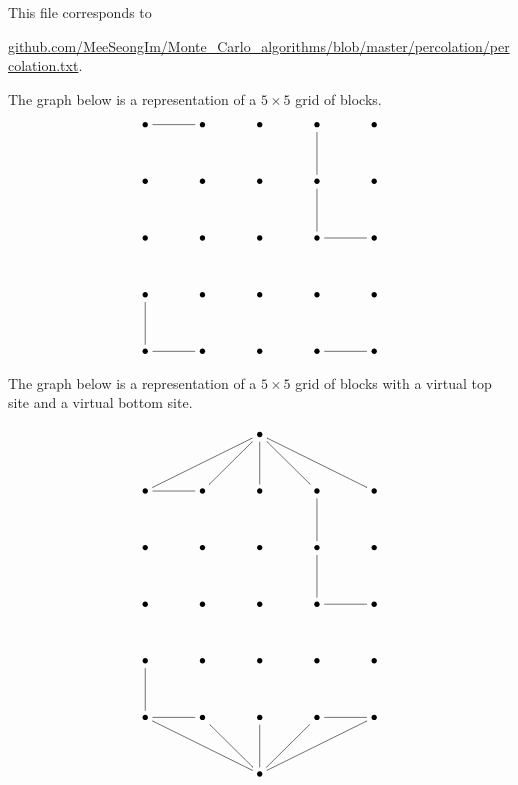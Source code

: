 \documentclass[reqno]{amsart}
\begin{document}
This file corresponds to

 \href{https://github.com/MeeSeongIm/Monte\_Carlo\_algorithms/blob/master/percolation/percolation.txt}{github.com/MeeSeongIm/Monte\_Carlo\_algorithms/blob/master/percolation/percolation.txt}.
 
\bigskip 
\bigskip 


  
The graph below is a representation of a $5\times 5$ grid of blocks. 
\[ 
\xymatrix@-1pc{
\bullet \ar@{-}[rr] & & \bullet & & \bullet & & \bullet \ar@{-}[dd]& & \bullet \\ 
 & &   & &   & &   & & \\ 
 \bullet & & \bullet & & \bullet & & \bullet \ar@{-}[dd]& & \bullet \\ 
 & &   & &   & &   & & \\ 
 \bullet & & \bullet & & \bullet & & \bullet \ar@{-}[rr]& & \bullet \\  
 & &   & &   & &   & & \\
  \bullet \ar@{-}[dd]& & \bullet & & \bullet & & \bullet & & \bullet \\  
 & &   & &   & &   & & \\
  \bullet \ar@{-}[rr]& & \bullet & & \bullet & & \bullet \ar@{-}[rr]& & \bullet \\  
} 
\] 

\bigskip 
\bigskip 
\bigskip 


The graph below is a representation of a $5\times 5$ grid of blocks with a virtual top site and a virtual bottom site. 

\[ 
\xymatrix@-1pc{
 & &   & & \bullet \ar@{-}[lllldd] \ar@{-}[lldd] \ar@{-}[dd] \ar@{-}[rrdd] \ar@{-}[rrrrdd]& &   & & \\
 & &   & &   & &   & & \\
\bullet \ar@{-}[rr] & & \bullet & & \bullet & & \bullet \ar@{-}[dd]& & \bullet \\ 
 & &   & &   & &   & & \\ 
 \bullet & & \bullet & & \bullet & & \bullet \ar@{-}[dd]& & \bullet \\ 
 & &   & &   & &   & & \\ 
 \bullet & & \bullet & & \bullet & & \bullet \ar@{-}[rr]& & \bullet \\  
 & &   & &   & &   & & \\
  \bullet \ar@{-}[dd]& & \bullet & & \bullet & & \bullet & & \bullet \\  
 & &   & &   & &   & & \\
  \bullet \ar@{-}[rr]& & \bullet & & \bullet & & \bullet \ar@{-}[rr]& & \bullet \\  
   & &   & &   & &   & & \\ 
   & &   & & \bullet \ar@{-}[lllluu] \ar@{-}[lluu] \ar@{-}[uu] \ar@{-}[rruu] \ar@{-}[rrrruu]& &   & & \\
} 
\] 
\end{document}
